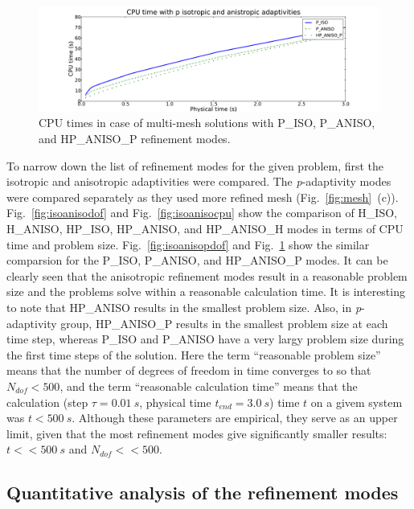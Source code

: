 \begin{figure}
  \begin{centering}
  \includegraphics[width=\columnwidth]{isoanisop_cpu}
  \caption{\label{fig:isoanisopcpu} CPU times in case 
  of multi-mesh solutions with P\_ISO, P\_ANISO, and
  HP\_ANISO\_P refinement modes.}
  \end{centering}
\end{figure}
To narrow down the list of refinement modes for the given problem, first the
isotropic and anisotropic adaptivities were compared. The \emph{p}-adaptivity
modes were compared separately as they used more refined mesh (Fig.~\ref{fig:mesh}~(c)).
Fig.~\ref{fig:isoanisodof} and Fig.~\ref{fig:isoanisocpu} show the comparison
of H\_ISO, H\_ANISO, HP\_ISO, HP\_ANISO, and HP\_ANISO\_H modes in terms of CPU time
and problem size.
Fig.~\ref{fig:isoanisopdof} and Fig.~\ref{fig:isoanisopcpu} show the similar
comparsion for the P\_ISO, P\_ANISO, and HP\_ANISO\_P modes.
It can be clearly seen that the anisotropic refinement modes result in a reasonable problem
size and the problems solve within a reasonable calculation time. It is interesting
to note that HP\_ANISO results in the smallest problem size. Also, in
\emph{p}-adaptivity group, HP\_ANISO\_P results in the smallest problem size
at each time step, whereas P\_ISO and P\_ANISO have a very largy problem size
during the first time steps of the solution.
Here the term ``reasonable problem size''
means that the number of degrees of freedom in time converges
to so that $N_{dof}<500$, and the term ``reasonable calculation time''
means that the calculation (step $\tau=0.01\ s$, physical
time $t_{end}=3.0\ s$) time $t$ on a givem system was $t<500\ s$.
Although these parameters are empirical, they serve as an upper limit, given
that the most refinement modes give significantly smaller results:
$t<<500\ s$ and $N_{dof} << 500$.

\subsection{Quantitative analysis of the refinement modes}

